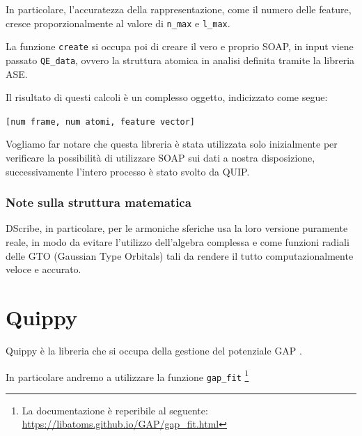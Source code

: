 In particolare, l'accuratezza della rappresentazione, come il numero delle feature, cresce proporzionalmente al valore di \texttt{n\_max} e \texttt{l\_max}.

La funzione \texttt{create} si occupa poi di creare il vero e proprio SOAP, in input viene passato \texttt{QE\_data}, ovvero la struttura atomica in analisi definita tramite la libreria ASE.

Il risultato di questi calcoli è un complesso oggetto, indicizzato come segue:

{\centering \verb|[num frame, num atomi, feature vector]|}

Vogliamo far notare che questa libreria è stata utilizzata solo inizialmente per verificare la possibilità di utilizzare SOAP sui dati a nostra disposizione, successivamente l'intero processo è stato svolto da QUIP.


\subsubsection{Note sulla struttura matematica} 

DScribe, in particolare, per le armoniche sferiche usa la loro versione puramente reale, in modo da evitare l'utilizzo dell'algebra complessa e come funzioni radiali delle GTO (Gaussian Type Orbitals) tali da rendere il tutto computazionalmente veloce e accurato.


\section{Quippy} %
\label{sec:quippy}

Quippy è la libreria che si occupa della gestione del potenziale GAP \cite{quip-doc, quip-gap-doc}.

In particolare andremo a utilizzare la funzione \texttt{gap\_fit} 
\footnote{La documentazione è reperibile al seguente: \url{https://libatoms.github.io/GAP/gap_fit.html} }


